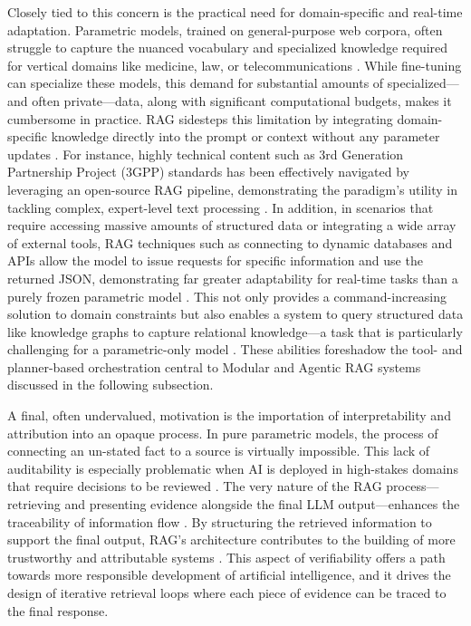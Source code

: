\documentclass[11pt,a4paper]{article}
\begin{document}
Closely tied to this concern is the practical need for domain-specific and real-time adaptation. Parametric models, trained on general-purpose web corpora, often struggle to capture the nuanced vocabulary and specialized knowledge required for vertical domains like medicine, law, or telecommunications \cite{arxiv:2404.15939v3}. While fine-tuning can specialize these models, this demand for substantial amounts of specialized---and often private---data, along with significant computational budgets, makes it cumbersome in practice. RAG sidesteps this limitation by integrating domain-specific knowledge directly into the prompt or context without any parameter updates \cite{arxiv:2312.10997v5}. For instance, highly technical content such as 3rd Generation Partnership Project (3GPP) standards has been effectively navigated by leveraging an open-source RAG pipeline, demonstrating the paradigm's utility in tackling complex, expert-level text processing \cite{arxiv:2404.15939v3}. In addition, in scenarios that require accessing massive amounts of structured data or integrating a wide array of external tools, RAG techniques such as connecting to dynamic databases and APIs allow the model to issue requests for specific information and use the returned JSON, demonstrating far greater adaptability for real-time tasks than a purely frozen parametric model \cite{arxiv:2305.15334v1}. This not only provides a command-increasing solution to domain constraints but also enables a system to query structured data like knowledge graphs to capture relational knowledge---a task that is particularly challenging for a parametric-only model \cite{arxiv:2408.08921v2,arxiv:2405.14831v1}. These abilities foreshadow the tool- and planner-based orchestration central to Modular and Agentic RAG systems discussed in the following subsection.

A final, often undervalued, motivation is the importation of interpretability and attribution into an opaque process. In pure parametric models, the process of connecting an un-stated fact to a source is virtually impossible. This lack of auditability is especially problematic when AI is deployed in high-stakes domains that require decisions to be reviewed \cite{arxiv:2307.10169v1}. The very nature of the RAG process---retrieving and presenting evidence alongside the final LLM output---enhances the traceability of information flow \cite{arxiv:2310.11511v1}. By structuring the retrieved information to support the final output, RAG's architecture contributes to the building of more trustworthy and attributable systems \cite{arxiv:2403.03187v1}. This aspect of verifiability offers a path towards more responsible development of artificial intelligence, and it drives the design of iterative retrieval loops where each piece of evidence can be traced to the final response.
\end{document}
